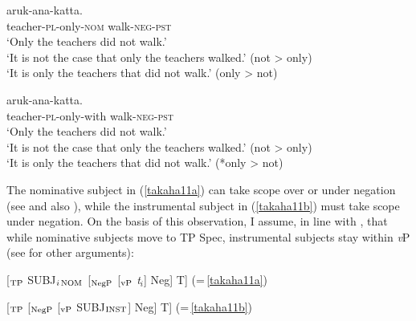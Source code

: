 \documentclass[output=paper]{langscibook}
\begin{document}
\begin{exe}
\ex \label{takaha11}
\begin{xlist}
\ex \label{takaha11a}
 {aruk-ana-katta}.\\
teacher-\textsc{pl}-only-\textsc{nom} walk-\textsc{neg}-\textsc{pst}\\
\glt `Only the teachers did not walk.'\\
`It is not the case that only the teachers walked.' (not \textgreater{} only)\\
`It is only the teachers that did not walk.’ (only \textgreater{} not)

\ex \label{takaha11b}
 {aruk-ana-katta}.\\
teacher-\textsc{pl}-only-with walk-\textsc{neg}-\textsc{pst}\\
\glt `Only the teachers did not walk.’  \\
‘It is not the case that only the teachers walked.' (not \textgreater{} only)\\
`It is only the teachers that did not walk.’ (*only \textgreater{} not)\\
\end{xlist}
\end{exe}

The nominative subject in (\ref{takaha11a}) can take scope over or under negation (see \citealt{Sakai2000} and also \citealt{Kataoka2006}), while the instrumental subject in (\ref{takaha11b}) must take scope under negation. On the basis of this observation, I assume, in line with \citet{Kishimoto2010}, that while nominative subjects move to TP Spec, instrumental subjects stay within \emph{v}P (see \citealt{Kishimoto2010} for other arguments):

\begin{exe}
\ex 
\begin{xlist}
\ex \label{takaha12a} [$_{\textnormal{TP}}$ \hspace{2mm} SUBJ$_{i\,\textnormal{NOM}}$ \hspace{2mm} [$_{\textnormal{NegP}}$ \hspace{1mm} [$_{\textnormal{vP}}$ \hspace{8mm} \emph{t}$_{i}$\hspace{8mm}] Neg] T] 
\hfill (=\,\ref{takaha11a})

\ex \label{takaha12b} [$_{\textnormal{TP}}$ \hspace{22mm} [$_{\textnormal{NegP}}$ \hspace{1mm} [$_{\textnormal{vP}}$ \hspace{1.7mm} SUBJ$_{\textnormal{INST}}$\hspace{1.7mm}] Neg] T] 
\hfill (=\,\ref{takaha11b})
\end{xlist}
\end{exe}
\end{document}
